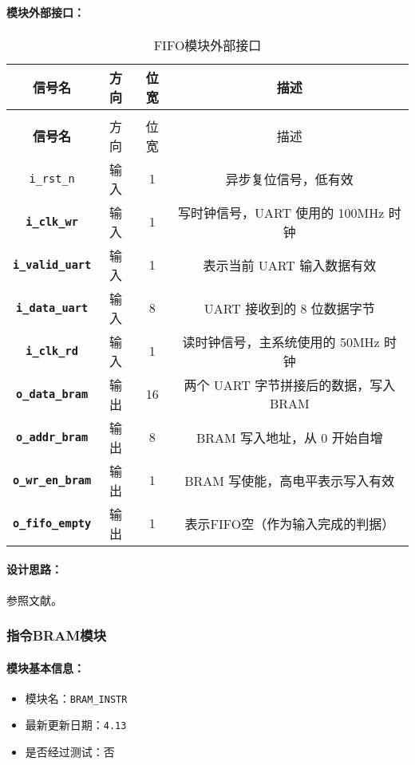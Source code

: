 \documentclass[lang=cn,a4paper,newtx]{elegantpaper}
\begin{document}
\paragraph{模块外部接口：}
\begin{longtable}{>{\bfseries}c c c c}
  \caption{FIFO模块外部接口} \\
  \toprule
  信号名 & 方向 & 位宽 & 描述 \\
  \midrule
  \endfirsthead

  \multicolumn{4}{l}{\textbf{（续表）FIFO模块外部接口}} \\
  \toprule
  信号名 & 方向 & 位宽 & 描述 \\
  \midrule
  \endhead

  \texttt{i\_rst\_n}         & 输入  & 1        & 异步复位信号，低有效 \\
  \texttt{i\_clk\_wr}        & 输入  & 1        & 写时钟信号，UART 使用的 100MHz 时钟 \\
  \texttt{i\_valid\_uart}    & 输入  & 1        & 表示当前 UART 输入数据有效 \\
  \texttt{i\_data\_uart}     & 输入  & 8        & UART 接收到的 8 位数据字节 \\
  \texttt{i\_clk\_rd}        & 输入  & 1        & 读时钟信号，主系统使用的 50MHz 时钟 \\
  \texttt{o\_data\_bram}     & 输出  & 16       & 两个 UART 字节拼接后的数据，写入 BRAM \\
  \texttt{o\_addr\_bram}     & 输出  & 8        & BRAM 写入地址，从 0 开始自增 \\
  \texttt{o\_wr\_en\_bram}   & 输出  & 1        & BRAM 写使能，高电平表示写入有效 \\
  \texttt{o\_fifo\_empty}    & 输出   & 1       & 表示FIFO空（作为输入完成的判据）\\
  \bottomrule
\end{longtable}
\paragraph{设计思路：}

参照文献\cite{fifo}。

\subsubsection{指令BRAM模块}
\paragraph{模块基本信息：}
\begin{itemize}
  \item 模块名：\texttt{BRAM\_INSTR}
  \item 最新更新日期：\texttt{4.13}
  \item 是否经过测试：否
\end{itemize}
\end{document}
